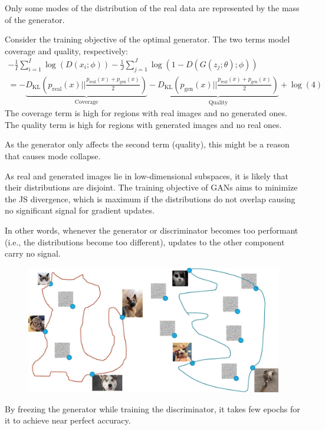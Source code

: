 \begin{remark}
    Only some modes of the distribution of the real data are represented by the mass of the generator.

    Consider the training objective of the optimal generator. The two terms model coverage and quality, respectively:
    \[ 
        \begin{gathered}
            -\frac{1}{I} \sum_{i=1}^I \log \left( D(x_i; \phi) \right) - \frac{1}{J} \sum_{j=1}^J \log \left( 1- D(G(z_j; \theta); \phi) \right) \\
            = - \underbrace{D_\text{KL}\left( p_\text{real}(x) || \frac{p_\text{real}(x) + p_\text{gen}(x)}{2} \right)}_{\text{Coverage}}
            - \underbrace{D_\text{KL}\left( p_\text{gen}(x) || \frac{p_\text{real}(x) + p_\text{gen}(x)}{2} \right)}_{\text{Quality}}
            + \log(4) 
        \end{gathered}
    \]
    The coverage term is high for regions with real images and no generated ones. The quality term is high for regions with generated images and no real ones.

    As the generator only affects the second term (quality), this might be a reason that causes mode collapse.
\end{remark}

\begin{remark}
    As real and generated images lie in low-dimensional subspaces, it is likely that their distributions are disjoint. The training objective of GANs aims to minimize the JS divergence, which is maximum if the distributions do not overlap causing no significant signal for gradient updates.

    In other words, whenever the generator or discriminator becomes too performant (i.e., the distributions become too different), updates to the other component carry no signal.

    \begin{figure}[H]
        \centering
        \includegraphics[width=0.7\linewidth]{./img/gan_disjoint.jpg}
    \end{figure}

    \indenttbox
    \begin{example}
        By freezing the generator while training the discriminator, it takes few epochs for it to achieve near perfect accuracy.
    \end{example}
\end{remark}


